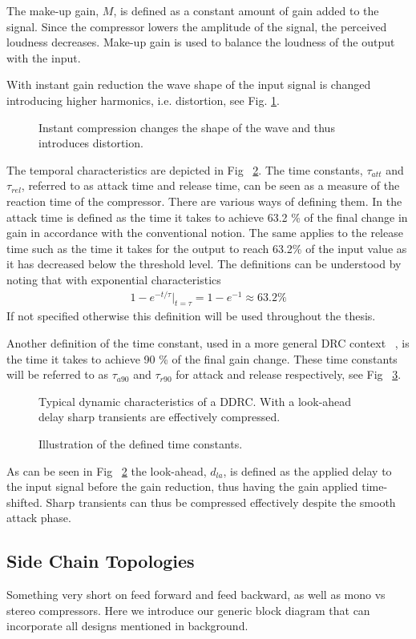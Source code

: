 \documentclass[../main2.tex]{subfiles}
\providecommand{\rootdir}{..}
\begin{document}
The make-up gain, $M$, is defined as a constant amount of gain added to the signal. Since the compressor lowers the amplitude of the signal, the perceived loudness decreases. Make-up gain is used to balance the loudness of the output with the input.

With instant gain reduction the wave shape of the input signal is changed introducing higher harmonics, i.e. distortion, see Fig. \ref{fig:instant_comp}. 
\begin{figure}[ht]
\centering

\caption{Instant compression changes the shape of the wave and thus introduces distortion.} 
\label{fig:instant_comp}
\end{figure}
The temporal characteristics are depicted in Fig ~\ref{fig:typical_envelope_detailed}. The time constants, $\tau_{att}$ and $\tau_{rel}$, referred to as attack time and release time, can be seen as a measure of the reaction time of the compressor. There are various ways of defining them. In \cite{mcnally1984dynamic} the attack time is defined as the time it takes to achieve 63.2 \% of the final change in gain in accordance with the conventional notion. The same applies to the release time such as the time it takes for the output to reach 63.2\% of the input value as it has decreased below the threshold level. The definitions can be understood by noting that with exponential characteristics
\begin{align}
1-e^{-t / \tau}\rvert_{t=\tau} = 1-e^{-1} \approx 63.2 \% \label{eq:time_const}
\end{align}
If not specified otherwise this definition will be used throughout the thesis.

Another definition of the time constant, used in a more general DRC context ~\cite{mcnally1984dynamic}, is the time it takes to achieve 90 \% of the final gain change. These time constants will be referred to as $\tau_{a90}$ and $\tau_{r90}$ for attack and release respectively, see Fig ~\ref{fig:time_constants}.
\begin{figure}
\centerline{}
\caption{Typical dynamic characteristics of a DDRC. With a look-ahead delay sharp transients are effectively compressed.}
\label{fig:typical_envelope_detailed}
\end{figure}
\begin{figure}
\centerline{}
\caption{Illustration of the defined time constants.}
\label{fig:time_constants}
\end{figure}
As can be seen in Fig ~\ref{fig:typical_envelope_detailed} the look-ahead, $d_{la}$, is defined as the applied delay to the input signal before the gain reduction, thus having the gain applied time-shifted. Sharp transients can thus be compressed effectively despite the smooth attack phase.

\subsection{Side Chain Topologies}
Something very short on feed forward and feed backward, as well as mono vs stereo compressors.
Here we introduce our generic block diagram that can incorporate all designs mentioned in background.
\end{document}
